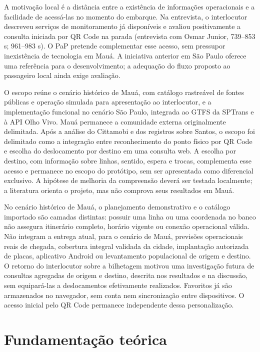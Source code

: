 \documentclass[12pt,oneside,a4paper,brazil,chapter=TITLE]{abntex2}
\let\papsection\section
\renewcommand{\section}{\clearpage\papsection}
\begin{document}
A motivação local é a distância entre a existência de informações operacionais e a facilidade de acessá-las no momento do embarque. Na entrevista, o interlocutor descreveu serviços de monitoramento já disponíveis e avaliou positivamente a consulta iniciada por QR Code na parada  (entrevista com Osmar Junior, 739--853 s; 961--983 s). O PaP pretende complementar esse acesso, sem pressupor inexistência de tecnologia em Mauá. A iniciativa anterior em São Paulo oferece uma referência para o desenvolvimento; a adequação do fluxo proposto ao passageiro local ainda exige avaliação.

O escopo reúne o cenário histórico de Mauá, com catálogo rastreável de fontes públicas e operação simulada para apresentação ao interlocutor, e a implementação funcional no cenário São Paulo, integrada ao GTFS da SPTrans e à API Olho Vivo. Mauá permanece a comunidade externa originalmente delimitada. Após a análise do Cittamobi e dos registros sobre Santos, o escopo foi delimitado como a integração entre reconhecimento do ponto físico por QR Code e escolha do deslocamento por destino em uma consulta web. A escolha por destino, com informação sobre linhas, sentido, espera e trocas, complementa esse acesso e permanece no escopo do protótipo, sem ser apresentada como diferencial exclusivo. A hipótese de melhoria da compreensão deverá ser testada localmente; a literatura orienta o projeto, mas não comprova seus resultados em Mauá.

No cenário histórico de Mauá, o planejamento demonstrativo e o catálogo importado são camadas distintas: possuir uma linha ou uma coordenada no banco não assegura itinerário completo, horário vigente ou conexão operacional válida. Não integram a entrega atual, para o cenário de Mauá, previsões operacionais reais de chegada, cobertura integral validada da cidade, implantação autorizada de placas, aplicativo Android ou levantamento populacional de origem e destino. O retorno do interlocutor sobre a bilhetagem motivou uma investigação futura de consultas agregadas de origem e destino, descrita nos resultados e na discussão, sem equipará-las a deslocamentos efetivamente realizados. Favoritos já são armazenados no navegador, sem conta nem sincronização entre dispositivos. O acesso inicial pelo QR Code permanece independente dessa personalização.

\section{Fundamentação teórica}
\end{document}
